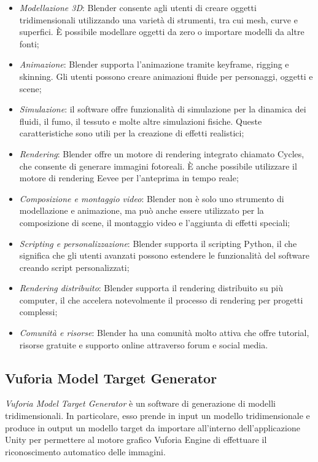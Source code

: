 \begin{itemize}
    \item \textit{Modellazione 3D}: Blender consente agli utenti di creare oggetti tridimensionali utilizzando una varietà di strumenti, tra cui mesh, curve e superfici. È possibile modellare oggetti da zero o importare modelli da altre fonti; 
    \item \textit{Animazione}: Blender supporta l'animazione tramite keyframe, rigging e skinning. Gli utenti possono creare animazioni fluide per personaggi, oggetti e scene;
    \item \textit{Simulazione}: il software offre funzionalità di simulazione per la dinamica dei fluidi, il fumo, il tessuto e molte altre simulazioni fisiche. Queste caratteristiche sono utili per la creazione di effetti realistici; 
    \item \textit{Rendering}: Blender offre un motore di rendering integrato chiamato Cycles, che consente di generare immagini fotoreali. È anche possibile utilizzare il motore di rendering Eevee per l'anteprima in tempo reale; 
    \item \textit{Composizione e montaggio video}: Blender non è solo uno strumento di modellazione e animazione, ma può anche essere utilizzato per la composizione di scene, il montaggio video e l'aggiunta di effetti speciali; 
    \item \textit{Scripting e personalizzazione}: Blender supporta il scripting Python, il che significa che gli utenti avanzati possono estendere le funzionalità del software creando script personalizzati; 
    \item \textit{Rendering distribuito}: Blender supporta il rendering distribuito su più computer, il che accelera notevolmente il processo di rendering per progetti complessi; 
    \item \textit{Comunità e risorse}: Blender ha una comunità molto attiva che offre tutorial, risorse gratuite e supporto online attraverso forum e social media.
\end{itemize}

\subsection{Vuforia Model Target Generator}

\textit{Vuforia Model Target Generator} è un software di generazione di modelli tridimensionali. In particolare, esso prende in input un modello tridimensionale e produce in output un modello target da importare all'interno dell'applicazione Unity per permettere al motore grafico Vuforia Engine di effettuare il riconoscimento automatico delle immagini.

